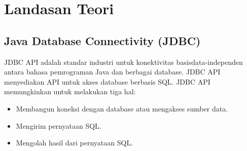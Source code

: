 \chapter{Landasan Teori}
\label{chap:LandasanTeori}

\section{Java Database Connectivity (JDBC)}
\label{sec:jdbc}
JDBC API \cite{jdbc} adalah standar industri untuk konektivitas basisdata-independen antara bahasa pemrograman Java dan berbagai database. JDBC API menyediakan API untuk akses database berbasis SQL. JDBC API memungkinkan untuk melakukan tiga hal: 
\begin{itemize}
	\item Membangun koneksi dengan database atau mengakses sumber data.
	\item Mengirim pernyataan SQL.
	\item Mengolah hasil dari pernyataan SQL.
\end{itemize}

